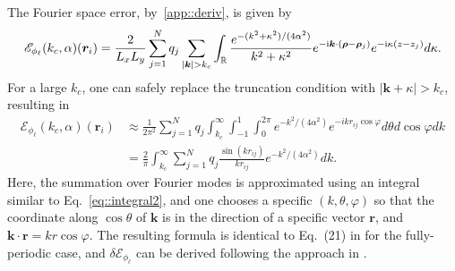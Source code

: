 The Fourier space error, by~\ref{app::deriv}, is given by
\begin{equation}
	\mathscr{E}_{\phi_{\ell}}(k_c,\alpha)(\bm{r}_{i})=\frac{2}{L_xL_y}\sum_{j=1}^{N}q_{j}\sum_{|\bm{k}|>k_c}\int_{\mathbb{R}}\frac{e^{-(k^2+\kappa^2)/(4\alpha^2)}}{k^2+\kappa^2}e^{-\m{i} \bm{k}\cdot(\bm{\rho}-\bm{\rho}_{j})}e^{-\m{i} \kappa(z-z_{j})}d\kappa.
\end{equation}
For a large $k_c$, one can safely replace the truncation condition with $|\bm{k}+\kappa|>k_c$, resulting in
\begin{equation}
	\begin{split}
		\mathscr{E}_{\phi_{\ell}}(k_c,\alpha)(\bm{r}_{i})&\approx \frac{1}{2\pi^2}\sum_{j=1}^{N}q_{j} \int_{k_c}^{\infty}\int_{-1}^{1}\int_{0}^{2\pi}e^{-k^2/(4\alpha^2)}e^{-i kr_{ij}\cos\varphi}d\theta d\cos\varphi dk\\
		&=\frac{2}{\pi}\int_{k_c}^{\infty}\sum_{j=1}^{N}q_{j}\frac{\sin(kr_{ij})}{kr_{ij}}e^{-k^2/(4\alpha^2)}dk.
	\end{split}
\end{equation}
Here, the summation over Fourier modes is approximated using an integral similar to Eq.~\eqref{eq::integral2}, and one chooses a specific $(k,\theta,\varphi)$ so that the coordinate along $\cos\theta$ of $\bm{k}$ is in the direction of a specific vector $\bm{r}$, and $\bm{k}\cdot\bm{r}=kr \cos\varphi$.
The resulting formula is identical to Eq.~(21) in \cite{kolafa1992cutoff} for the fully-periodic case, and $\delta \mathscr{E}_{\phi_{\ell}}$ can be derived following the approach in \cite{kolafa1992cutoff}. 